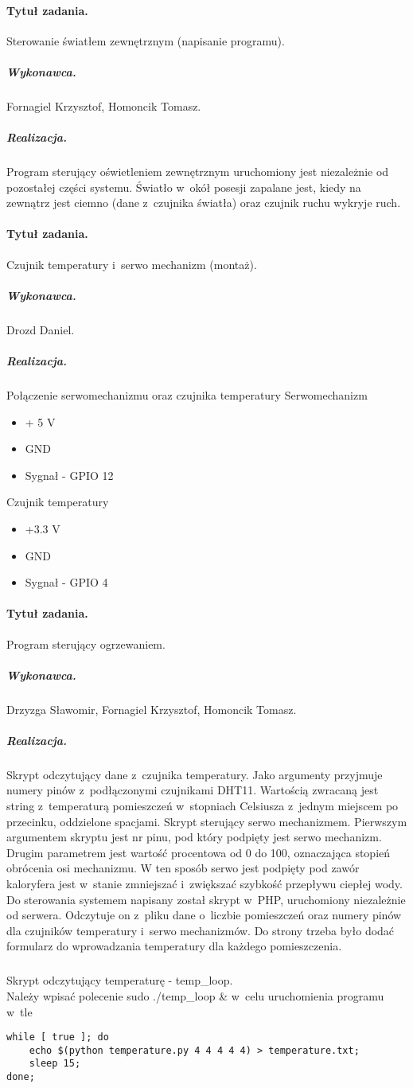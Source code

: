 \paragraph{Tytuł zadania.} Sterowanie światłem zewnętrznym (napisanie programu).
\subparagraph{Wykonawca.} Fornagiel Krzysztof, Homoncik Tomasz.
\subparagraph{Realizacja.} Program sterujący oświetleniem zewnętrznym uruchomiony jest niezależnie od pozostałej części systemu. Światło w~okół posesji zapalane jest, kiedy na zewnątrz jest ciemno (dane z~czujnika światła) oraz czujnik ruchu wykryje ruch.

\paragraph{Tytuł zadania.} Czujnik temperatury i~serwo mechanizm (montaż).
\subparagraph{Wykonawca.} Drozd Daniel.
\subparagraph{Realizacja.} Połączenie serwomechanizmu oraz czujnika temperatury
Serwomechanizm

\begin{itemize}
	\item + 5 V
	\item GND
	\item Sygnał - GPIO 12
\end{itemize}
Czujnik temperatury
\begin{itemize}
	\item +3.3 V
	\item GND
	\item Sygnał - GPIO 4
\end{itemize}


\paragraph{Tytuł zadania.} Program sterujący ogrzewaniem.
\subparagraph{Wykonawca.} Drzyzga Sławomir, Fornagiel Krzysztof, Homoncik Tomasz.
\subparagraph{Realizacja.} Skrypt odczytujący dane z~czujnika temperatury. Jako argumenty przyjmuje numery pinów z~podłączonymi czujnikami DHT11. Wartością zwracaną jest string z~temperaturą pomieszczeń w~stopniach Celsiusza z~jednym miejscem po przecinku, oddzielone spacjami. 
\break
Skrypt sterujący serwo mechanizmem. Pierwszym argumentem skryptu jest nr pinu, pod który podpięty jest serwo mechanizm. Drugim parametrem jest wartość procentowa od 0 do 100, oznaczająca stopień obrócenia osi mechanizmu. W ten sposób serwo jest podpięty pod zawór kaloryfera jest w~stanie zmniejszać i~zwiększać szybkość przepływu ciepłej wody.
\break
Do sterowania systemem napisany został skrypt w~PHP, uruchomiony niezależnie od serwera. Odczytuje on z~pliku dane o~liczbie pomieszczeń oraz numery pinów dla czujników temperatury i~serwo mechanizmów.
Do strony trzeba było dodać formularz do wprowadzania temperatury dla każdego pomieszczenia.
\subparagraph{}
Skrypt odczytujący temperaturę - temp\_loop. \\
Należy wpisać polecenie sudo ./temp\_loop \& w~celu uruchomienia programu w~tle
\begin{verbatim}
while [ true ]; do 
	echo $(python temperature.py 4 4 4 4 4) > temperature.txt; 
	sleep 15; 
done;
\end{verbatim}


